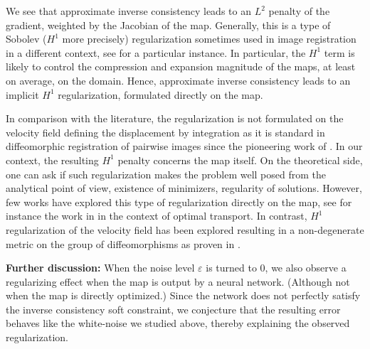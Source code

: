\documentclass[10pt,onecolumn,letterpaper]{article} %
\newcommand{\fxpsi}{\Phi_{\theta}^{BA}}
\newcommand{\fxvarphi}{\Phi_{\theta}^{AB}}
\begin{document}
We see that approximate inverse consistency leads to an $L^2$ penalty of the gradient, weighted by the Jacobian of the map. Generally, this is a type of Sobolev ($H^1$ more precisely) regularization sometimes used in image registration in a different context, see \cite{template_matching} for a particular instance. In particular, the $H^1$ term is likely to control the compression and expansion magnitude of the maps, at least on average, on the domain.
Hence, approximate inverse consistency leads to an implicit $H^1$ regularization, formulated directly on the map. 
\par
In comparison with the literature, the regularization is not formulated on the velocity field defining the displacement by integration as it is standard in diffeomorphic registration of pairwise images since the pioneering work of \cite{DuGrMi1998}. In our context, the resulting $H^1$ penalty concerns the map itself. On the theoretical side, one can ask if such regularization makes the problem well posed from the analytical point of view, \ie existence of minimizers, regularity of solutions. However, few works have explored this type of regularization directly on the map, see for instance the work in \cite{DEPASCALE2016237} in the context of optimal transport. In contrast, $H^1$ regularization of the velocity field has been explored resulting in a non-degenerate metric on the group of diffeomorphisms as proven in \cite{Michor2005}.
\par{\textbf{Further discussion: }}
When the noise level $\varepsilon$ is turned to $0$, we also observe a regularizing effect when the map is output by a neural network. (Although not when the map is directly optimized.) Since the network does not perfectly satisfy the inverse consistency soft constraint, we conjecture that the resulting error behaves like the white-noise we studied above, thereby explaining the observed regularization. 
\end{document}
